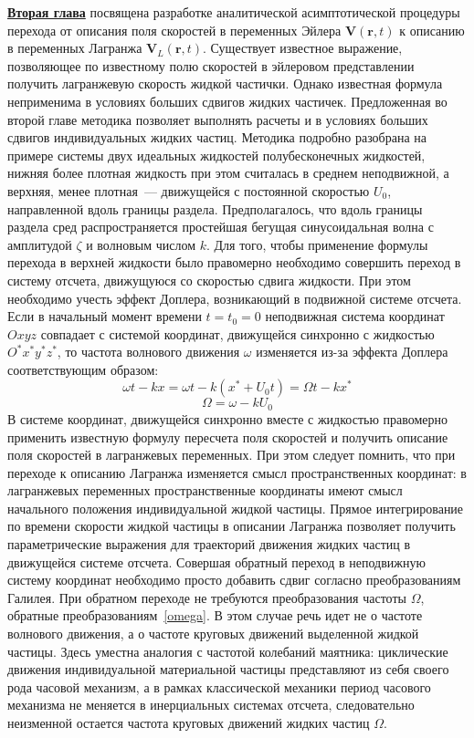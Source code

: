 \underline{\textbf{Вторая глава}} посвящена разработке аналитической асимптотической процедуры перехода от описания поля скоростей в переменных Эйлера $ \mathbf{V}\left( \mathbf{r},t \right) $ к описанию в переменных Лагранжа $ \mathbf{V}_{L}\left( \mathbf{r},t \right) $.  Существует известное выражение, позволяющее по известному полю скоростей в эйлеровом представлении получить лагранжевую скорость жидкой частички. Однако известная формула неприменима в условиях больших сдвигов жидких частичек. Предложенная во второй главе методика позволяет выполнять расчеты и в условиях больших сдвигов индивидуальных жидких частиц. Методика подробно разобрана на примере системы двух идеальных жидкостей полубесконечных жидкостей, нижняя более плотная жидкость при этом считалась в среднем неподвижной, а верхняя, менее плотная~--- движущейся с постоянной скоростью $ U_{0} $, направленной вдоль границы раздела. Предполагалось, что вдоль границы раздела сред распространяется простейшая бегущая синусоидальная волна с амплитудой $ \zeta $ и волновым числом $ k $. Для того, чтобы применение формулы перехода в верхней жидкости было правомерно необходимо совершить переход в систему отсчета, движущуюся со скоростью сдвига жидкости. При этом необходимо учесть эффект Доплера, возникающий в подвижной системе отсчета. Если в начальный момент времени $ t=t_{0}=0 $ неподвижная система координат $ Oxyz $ совпадает с системой координат, движущейся синхронно с жидкостью  $ O^{*}x^{*}y^{*}z^{*} $, то частота волнового движения $ \omega $ изменяется из-за эффекта Доплера соответствующим образом:
\begin{equation}
\omega t-k x=\omega t -k \left( x^{*}+U_{0} t \right) = \Omega t -k x^{*}
\label{omega}
\end{equation}
\begin{equation*}
\Omega = \omega - k U_{0}
\end{equation*}
В системе координат, движущейся синхронно вместе с жидкостью правомерно применить известную формулу пересчета поля скоростей и получить описание поля скоростей в лагранжевых переменных. При этом следует помнить, что при переходе к описанию Лагранжа изменяется смысл пространственных координат: в лагранжевых переменных пространственные координаты имеют смысл начального положения индивидуальной жидкой частицы. Прямое интегрирование по времени скорости жидкой частицы в описании Лагранжа позволяет получить параметрические выражения для траекторий движения жидких частиц в движущейся системе отсчета. Совершая обратный переход в неподвижную систему координат необходимо просто добавить сдвиг согласно преобразованиям Галилея. При обратном переходе не требуются преобразования частоты $ \Omega $, обратные преобразованиям~\eqref{omega}. В этом случае речь идет не о частоте волнового движения, а о частоте круговых движений выделенной жидкой частицы. Здесь уместна аналогия с частотой колебаний маятника: циклические движения индивидуальной материальной частицы представляют из себя своего рода часовой механизм, а в рамках классической механики период часового механизма не меняется в инерциальных системах отсчета, следовательно неизменной остается частота круговых движений жидких частиц $ \Omega $.

